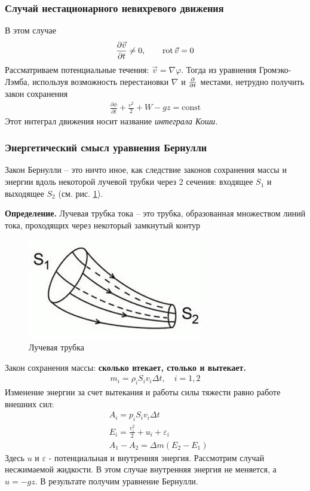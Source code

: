 \subsubsection{Случай нестационарного невихревого движения}
В этом случае
\begin{align*}
	\frac { \partial \vec{v} } { \partial t } \neq 0, \qquad
	\operatorname{rot} \vec{v} = 0
\end{align*}
Рассматриваем  потенциальные течения: $ \vec{v} = \nabla \varphi $. Тогда из уравнения Громэко-Лэмба, используя возможность перестановки $\nabla$ и $\pdv{t}$ местами, нетрудно получить закон сохранения
\begin{align*}
\frac { \partial \phi } { \partial t } + \frac { v ^ { 2 } } { 2 } + W - g z = \mathrm { const }
\end{align*}
Этот интеграл движения носит название \textit{интеграла Коши.}

\subsubsection{Энергетический смысл уравнения Бернулли}

Закон Бернулли --  это ничто иное, как следствие законов сохранения массы и энергии вдоль некоторой лучевой трубки через 2 сечения: входящее $S_1$ и выходящее $S_2$ (см. рис. \ref{fig:figure7}).

\textbf{Определение. } Лучевая трубка тока -- это трубка, образованная множеством линий тока, проходящих через некоторый замкнутый контур
\begin{figure}[H]
	\centering
	\includegraphics[scale=1]{photo/trubka.jpg}
	\caption{Лучевая трубка}
	\label{fig:figure7}
\end{figure}

Закон сохранения массы: \textbf{сколько втекает, столько и вытекает.}
\begin{align*}
m _ { i } = \rho _ { i } S _ { i } v _ { i } \Delta t , \quad i = 1,2
\end{align*}
Изменение энергии за счет вытекания и работы силы тяжести равно работе внешних сил:
\begin{align*}
& A _ { i } = p _ { i } S _ { i } v _ { i } \Delta t \\
& E _ { i } = \frac { v _ { i } ^ { 2 } } { 2 } + u _ { i } + \varepsilon _ { i } \\
& A _ { 1 } - A _ { 2 } = \Delta m \left( E _ { 2 } - E _ { 1 } \right)
\end{align*}
Здесь $u$ и $\varepsilon$ - потенциальная и внутренняя энергия. Рассмотрим случай несжимаемой жидкости. В этом случае внутренняя энергия не меняется, а $ u = - g z $. В результате получим уравнение Бернулли.



